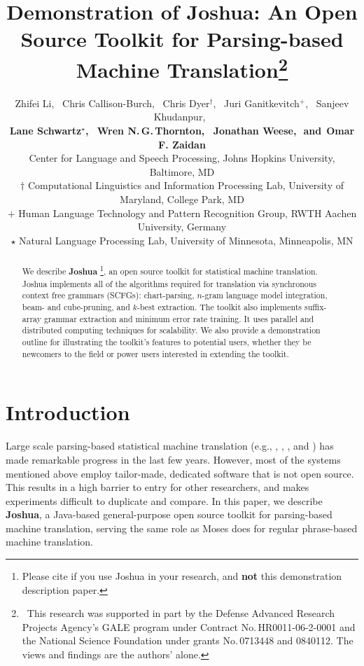 \documentclass[11pt]{article}
\title{Demonstration of Joshua: An Open Source Toolkit for Parsing-based Machine Translation\thanks{$\;\:$This
research was supported in part by the Defense Advanced Research Projects Agency's GALE program under
Contract No.\,HR0011-06-2-0001 and the National Science Foundation under grants No.\,0713448 and 0840112. The
views and findings are the authors' alone.}}
\author{
Zhifei Li,\,\,\,
Chris Callison-Burch,\,\,\, %
Chris Dyer$^\dagger$,\,\,\,
Juri Ganitkevitch$^+$,\,\,\,
Sanjeev Khudanpur,\,\,\, \\
{\bf Lane Schwartz$^\star$,\,\,\,
Wren N.\,G.\,Thornton,\,\,\,
Jonathan Weese,\,\,
{\textnormal{and}}\,\,\,Omar F. Zaidan}\\
Center for Language and Speech Processing, Johns Hopkins University, Baltimore, MD\\
$\dagger$ Computational Linguistics and Information Processing Lab, University of Maryland, College Park, MD\\
$+$ Human Language Technology and Pattern Recognition Group, RWTH Aachen University, Germany\\
$\star$ Natural Language Processing Lab, University of Minnesota, Minneapolis, MN }
\date{}
\begin{document}
\maketitle


\begin{abstract}

We describe \textbf{Joshua} \cite{Joshua-WMT}\footnote{Please cite  if you use
Joshua in your research, and {\bf not} this demonstration description paper.}, an open source toolkit for statistical machine
translation.  Joshua implements all of the algorithms required for translation
via synchronous context free grammars (SCFGs): chart-parsing, $n$-gram language
model integration, beam- and cube-pruning, and $k$-best extraction.  The toolkit
also implements suffix-array grammar extraction and minimum error rate training.
It uses parallel and distributed computing techniques for scalability.  We also
provide a demonstration outline for illustrating the toolkit's features to
potential users, whether they be newcomers to the field or power users interested
in extending the toolkit.

\end{abstract}

\section{Introduction}

Large scale parsing-based statistical machine translation (e.g., ,
, , and ) has made
remarkable progress in the last few years.  However, most of the systems mentioned
above employ tailor-made, dedicated software that is not open source.  This results
in a high barrier to entry for other researchers, and makes experiments difficult to
duplicate and compare.  In this paper, we describe \textbf{Joshua}, a Java-based
general-purpose open source toolkit for parsing-based machine translation, serving the
same role as Moses \cite{Moses} does for regular phrase-based machine translation.

\end{document}
